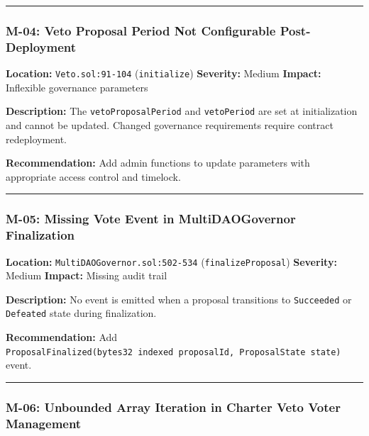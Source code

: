 \documentclass[
]{article}
\begin{document}
\begin{center}\rule{0.5\linewidth}{0.5pt}\end{center}

\subsubsection{M-04: Veto Proposal Period Not Configurable
Post-Deployment}\label{m-04-veto-proposal-period-not-configurable-post-deployment}

\textbf{Location:} \texttt{Veto.sol:91-104} (\texttt{initialize})
\textbf{Severity:} Medium \textbf{Impact:} Inflexible governance
parameters

\textbf{Description:} The \texttt{vetoProposalPeriod} and
\texttt{vetoPeriod} are set at initialization and cannot be updated.
Changed governance requirements require contract redeployment.

\textbf{Recommendation:} Add admin functions to update parameters with
appropriate access control and timelock.

\begin{center}\rule{0.5\linewidth}{0.5pt}\end{center}

\subsubsection{M-05: Missing Vote Event in MultiDAOGovernor
Finalization}\label{m-05-missing-vote-event-in-multidaogovernor-finalization}

\textbf{Location:} \texttt{MultiDAOGovernor.sol:502-534}
(\texttt{finalizeProposal}) \textbf{Severity:} Medium \textbf{Impact:}
Missing audit trail

\textbf{Description:} No event is emitted when a proposal transitions to
\texttt{Succeeded} or \texttt{Defeated} state during finalization.

\textbf{Recommendation:} Add
\texttt{ProposalFinalized(bytes32\ indexed\ proposalId,\ ProposalState\ state)}
event.

\begin{center}\rule{0.5\linewidth}{0.5pt}\end{center}

\subsubsection{M-06: Unbounded Array Iteration in Charter Veto Voter
Management}\label{m-06-unbounded-array-iteration-in-charter-veto-voter-management}
\end{document}
